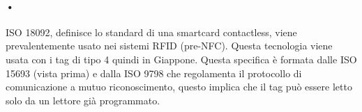 \paragraph{•} ISO 18092, definisce lo standard di una smartcard contactless, viene prevalentemente usato nei sistemi RFID (pre-NFC). Questa tecnologia  viene usata con i tag di tipo 4 quindi in Giappone. Questa specifica è formata dalle ISO 15693 (vista prima) e dalla ISO 9798 che regolamenta il protocollo di comunicazione a mutuo riconoscimento, questo implica che il tag può essere letto solo da un lettore già programmato.



